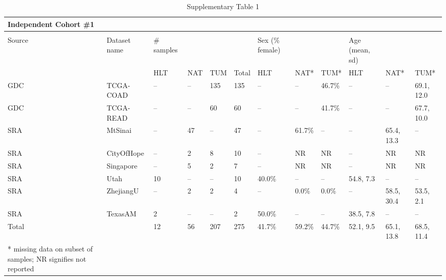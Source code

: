 \begin{table}[ht]
    \centering
    \begin{tabular}{|l|l|l|l|l|l|l|l|l|l|l|l|}
    \hline
        Independent Cohort \#1 &  &  &  &  &  &  &  &  &  &  &  \\ \hline
         &  &  &  &  &  &  &  &  &  &  &  \\ \hline
        Source & Dataset name & \# samples &  &  &  & Sex (\% female) &  &  & Age (mean, sd) &  &  \\ \hline
         &  & HLT & NAT & TUM & Total & HLT & NAT* & TUM* & HLT & NAT* & TUM* \\ \hline
        GDC & TCGA-COAD & -- & -- & 135 & 135 & -- & -- & 46.7\% & -- & -- & 69.1, 12.0 \\ \hline
        GDC & TCGA-READ & -- & -- & 60 & 60 & -- & -- & 41.7\% & -- & -- & 67.7, 10.0 \\ \hline
        SRA & MtSinai & -- & 47 & -- & 47 & -- & 61.7\% & -- & -- & 65.4, 13.3 & -- \\ \hline
        SRA & CityOfHope & -- & 2 & 8 & 10 & -- & NR & NR & -- & NR & NR \\ \hline
        SRA & Singapore & -- & 5 & 2 & 7 & -- & NR & NR & -- & NR & NR \\ \hline
        SRA & Utah & 10 & -- & -- & 10 & 40.0\% & -- & -- & 54.8, 7.3 & -- & -- \\ \hline
        SRA & ZhejiangU & -- & 2 & 2 & 4 & -- & 0.0\% & 0.0\% & -- & 58.5, 30.4 & 53.5, 2.1 \\ \hline
        SRA & TexasAM & 2 & -- & -- & 2 & 50.0\% & -- & -- & 38.5, 7.8 & -- & -- \\ \hline
        Total &  & 12 & 56 & 207 & 275 & 41.7\% & 59.2\% & 44.7\% & 52.1, 9.5 & 65.1, 13.8 & 68.5, 11.4 \\ \hline
        * missing data on subset of samples; NR signifies not reported &  &  &  &  &  &  &  &  &  &  &  \\ \hline
    \end{tabular}
    \caption{Supplementary Table 1}
    \label{tab:ind1}
\end{table}

